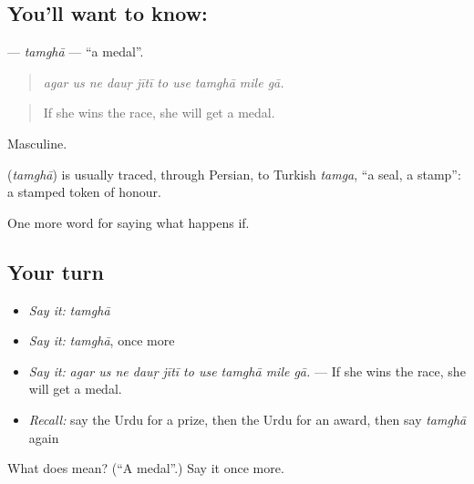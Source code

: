 \subsection*{You'll want to know: }
\textbf{} — \emph{tamghā} — \textquotedblleft{}a medal\textquotedblright{}.

\begin{quote}
         
\end{quote}

\begin{quote}
\emph{agar us ne dauṛ jītī to use tamghā mile gā.}
\end{quote}

\begin{quote}
If she wins the race, she will get a medal.
\end{quote}

Masculine.

\begin{cousinweb}
\textbf{} (\emph{tamghā}) is usually traced, through Persian, to Turkish \emph{tamga}, \textquotedblleft{}a seal, a stamp\textquotedblright{}: a stamped token of honour.
\end{cousinweb}

\begin{grammarlens}[title={What you've built}]
One more word for saying what happens if.
\end{grammarlens}

\subsection*{Your turn}
\begin{itemize}
\raggedright
  \item \emph{Say it:} \emph{tamghā}
  \item \emph{Say it:} \emph{tamghā}, once more
  \item \emph{Say it:} \emph{agar us ne dauṛ jītī to use tamghā mile gā.} — If she wins the race, she will get a medal.
  \item \emph{Recall:} say the Urdu for a prize, then the Urdu for an award, then say \emph{tamghā} again
\end{itemize}

\begin{tcolorbox}[breakable,colback=teal!4,colframe=teal!35!black,title={Before you move on}]
What does  mean? (\textquotedblleft{}A medal\textquotedblright{}.) Say it once more.
\end{tcolorbox}
